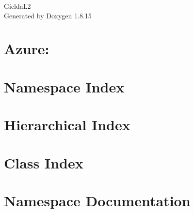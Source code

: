 \let\mypdfximage\pdfximage\def\pdfximage{\immediate\mypdfximage}\documentclass[twoside]{book}
\newcommand{\+}{\discretionary{\mbox{\scriptsize$\hookleftarrow$}}{}{}}
\newcommand{\clearemptydoublepage}{%
  \newpage{\pagestyle{empty}\cleardoublepage}%
}
\begin{document}
\hypersetup{pageanchor=false,
             bookmarksnumbered=true,
             pdfencoding=unicode
            }
\begin{titlepage}
\vspace*{7cm}
\begin{center}%
{\Large Gielda\+L2 }\\
\vspace*{1cm}
{\large Generated by Doxygen 1.8.15}\\
\end{center}
\end{titlepage}
\clearemptydoublepage
{}
\tableofcontents
\clearemptydoublepage
{}
\hypersetup{pageanchor=true}

\chapter{Azure\+:}
\label{index}\hypertarget{index}{}
\chapter{Namespace Index}

\chapter{Hierarchical Index}

\chapter{Class Index}

\chapter{Namespace Documentation}





















\end{document}
